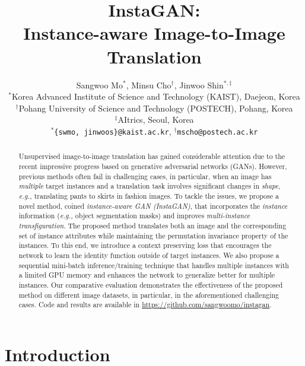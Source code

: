 \documentclass{article} \usepackage{iclr2019_conference,times}
\title{InstaGAN:\\ Instance-aware Image-to-Image Translation}
\author{Sangwoo Mo$^*$, Minsu Cho$^\dagger$, Jinwoo Shin$^{*,\ddagger}$ \\
$^*$Korea Advanced Institute of Science and Technology (KAIST), Daejeon, Korea \\
$^\dagger$Pohang University of Science and Technology (POSTECH), Pohang, Korea \\
$^\ddagger$AItrics, Seoul, Korea \\
$^*$\texttt{\{swmo, jinwoos\}@kaist.ac.kr}, \quad $^\dagger$\texttt{mscho@postech.ac.kr}}
\begin{document}
\maketitle

\vspace{-0.2in}
\begin{abstract}
\vspace{-0.05in}
Unsupervised image-to-image translation has gained considerable attention due to  
the recent impressive progress based on generative adversarial networks (GANs). However, previous methods often fail in challenging cases,
in particular, when an image has \textit{multiple} target instances and a translation task involves significant changes in \textit{shape},  \textit{e.g.,} translating pants to skirts in fashion images. To tackle the issues, we propose a novel method, coined \textit{instance-aware GAN (InstaGAN)},
that incorporates the \textit{instance} information
{(\textit{e.g.,} object  segmentation masks)}
and improves    \textit{multi-instance transfiguration}.
The proposed method translates both an image and the corresponding set of instance attributes while maintaining the permutation invariance property of the instances. To this end, we introduce a context preserving loss that encourages 
the network to learn the identity function outside of target instances.  
We also propose a sequential mini-batch inference/training technique  
that handles multiple instances with a limited GPU memory and enhances the network 
to generalize better for multiple instances. Our comparative evaluation demonstrates the effectiveness of the proposed method on different image datasets, in particular, in the aforementioned challenging cases.
Code and results are available in \url{https://github.com/sangwoomo/instagan}.
\end{abstract}
\vspace{-0.05in}


\vspace{-0.05in}
\section{Introduction}
\label{sec:intro}
\vspace{-0.05in}
\end{document}
